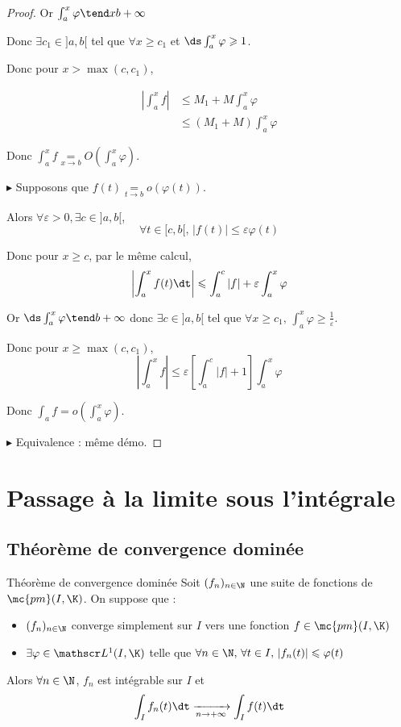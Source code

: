 \begin{proof}
    Or $\int_{a }^{x } \varphi \tend x b + \infty$

    Donc $\exists c_1 \in ]a, b[$ tel que $\forall x \geqslant c_1$ et $\ds \int_{a }^{x } \varphi \geqslant 1$. 

    Donc pour $x > \max (c, c_1)$, 

    \begin{align}
        \left| \int_{a }^{x } f \right| & \leqslant M_1 + M \int_{a }^{x } \varphi \\
        & \leqslant (M_1 + M) \int_{a }^{x } \varphi
    \end{align}

    Donc $\int_{a }^{x } f \underset{x \to b }{=} O\left( \int_{a }^{x } \varphi \right)$.

    $\blacktriangleright$ Supposons que $f(t) \underset{t \to b }{= } o(\varphi(t))$. 

    Alors $\forall \varepsilon > 0, \exists c \in ]a, b[$, 
    $$\forall t \in [c, b[, \, |f(t)| \leqslant \varepsilon \varphi(t)$$

    Donc pour $x \geqslant c$, par le même calcul, 
    $$\left| \int_{a }^{x } f(t) \dt \right| \leqslant \int_a^c | f| + \varepsilon \int_a^x \varphi$$

    Or $\ds \int_a^x \varphi \tend  b + \infty$ donc $\exists c \in ]a, b[$ tel que 
    $\forall x \geqslant c_1, \, \int_a^x \varphi \geqslant \frac 1 \varepsilon$.

    Donc pour $x \geqslant \max (c, c_1)$,
    $$\left| \int_a^x f \right| \leqslant \varepsilon \left[ \int_a^c |f| + 1 \right] \int_a^x \varphi$$

    Donc $\int_a f = o\left( \int_a^x \varphi \right)$.

    $\blacktriangleright$ Equivalence : même démo. 
\end{proof}


\section{Passage à la limite sous l'intégrale}
\subsection{Théorème de convergence dominée }

\begin{theoreme}{Théorème de convergence dominée}{}
    Soit $(f_n)_{n \in \N}$ une suite de fonctions de $\mc {pm}(I, \K)$. On suppose que :
    \begin{itemize}
        \item $(f_n)_{n \in \N}$ converge simplement sur $I$ vers une fonction $f \in \mc {pm}(I, \K)$
        \item $\exists \varphi \in \mathscr L^1(I, \K)$ telle que 
        $\forall n \in \N, \, \forall t \in I, \, |f_n(t)| \leqslant \varphi(t)$
    \end{itemize}
    Alors 
    $\forall n \in \N$, $f_n$ est intégrable sur $I$ et 
    $$\int_I f_n(t) \dt \xrightarrow[n \to + \infty]{} \int_I f(t) \dt$$
\end{theoreme}


